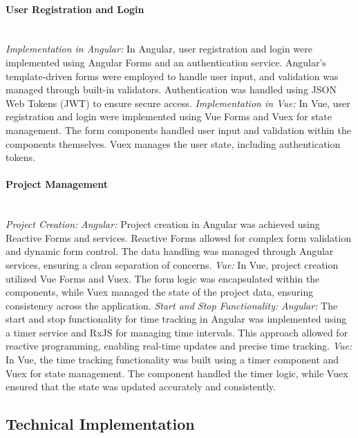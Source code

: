 \documentclass[conference]{IEEEtran}
\begin{document}
\paragraph{User Registration and Login}
\textit{\\Implementation in Angular: }In Angular, user registration and login were implemented using Angular Forms and an authentication service. Angular's template-driven forms were employed to handle user input, and validation was managed through built-in validators. Authentication was handled using JSON Web Tokens (JWT) to ensure secure access.\newline
\textit{Implementation in Vue: }In Vue, user registration and login were implemented using Vue Forms and Vuex for state management. The form components handled user input and validation within the components themselves. Vuex manages the user state, including authentication tokens.
\newline
\paragraph{Project Management}
\textit{\\Project Creation:\newline}
\textit{Angular: }Project creation in Angular was achieved using Reactive Forms and services. Reactive Forms allowed for complex form validation and dynamic form control. The data handling was managed through Angular services, ensuring a clean separation of concerns.
\newline\textit{Vue: }In Vue, project creation utilized Vue Forms and Vuex. The form logic was encapsulated within the components, while Vuex managed the state of the project data, ensuring consistency across the application.
\newline\newline
\textit{Start and Stop Functionality:\newline}
\textit{Angular: }The start and stop functionality for time tracking in Angular was implemented using a timer service and RxJS for managing time intervals. This approach allowed for reactive programming, enabling real-time updates and precise time tracking.
\newline\textit{Vue: }In Vue, the time tracking functionality was built using a timer component and Vuex for state management. The component handled the timer logic, while Vuex ensured that the state was updated accurately and consistently.
\subsection{Technical Implementation}
\end{document}
